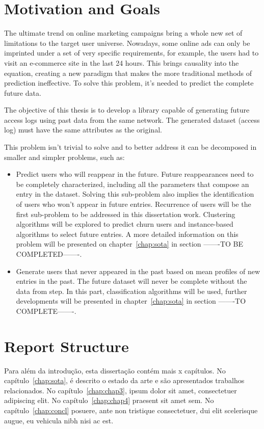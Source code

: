\section{Motivation and Goals} \label{sec:goals}

The ultimate trend on online marketing campaigns bring a whole new set of limitations to the target user universe. Nowadays, some online ads can only
be imprinted under a set of very specific requirements, for example, the users had to visit an e-commerce site in the last 24 hours. 
This brings causality into the equation, creating a new paradigm that makes 
the more traditional methods of prediction ineffective. To solve this problem, it's needed to predict the complete future data.

The objective of this thesis is to develop a library capable of generating future access logs using past data from the same network.
The generated dataset (access log) must have the same attributes as the original.

This problem isn't trivial to solve and to better address it can be decomposed in smaller and simpler problems, such as:
\begin{itemize}
    \item Predict users who will reappear in the future. Future reappearances need to be completely characterized, including 
      all the parameters that compose an entry in the dataset. Solving this sub-problem also implies the identification of users who
      won't appear in future entries. Recurrence of users will be the first sub-problem to be addressed in this dissertation work. 
      Clustering algorithms will be explored to predict churn users and instance-based algorithms to select future entries. A more detailed information
      on this problem will be presented on chapter~\ref{chap:sota} in section -------TO BE COMPLETED-------.
    \item Generate users that never appeared in the past based on mean profiles of new entries in the past. The future dataset will never
      be complete without the data from step. In this part, classification algorithms will be used, further developments will be presented in
      chapter~\ref{chap:sota} in section -------TO COMPLETE-------.
\end{itemize}

\section{Report Structure} \label{sec:struct}

Para além da introdução, esta dissertação contém mais x capítulos.
No capítulo~\ref{chap:sota}, é descrito o estado da arte e são
apresentados trabalhos relacionados. 
No capítulo~\ref{chap:chap3}, ipsum dolor sit amet, consectetuer
adipiscing elit.
No capítulo~\ref{chap:chap4} praesent sit amet sem. 
No capítulo~\ref{chap:concl}  posuere, ante non tristique
consectetuer, dui elit scelerisque augue, eu vehicula nibh nisi ac
est. 
